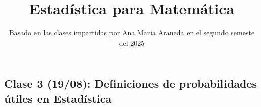 \documentclass[a4paper]{report}
\title{Estadística para Matemática}
\author{Basado en las clases impartidas por Ana María Araneda en el segundo semeste del 2025}
\begin{document}
    \maketitle
    \tableofcontents

    \chapter{}
    \setcounter{section}{0}
	\section{Clase 3 (19/08): Definiciones de probabilidades útiles en Estadística}













\end{document}
